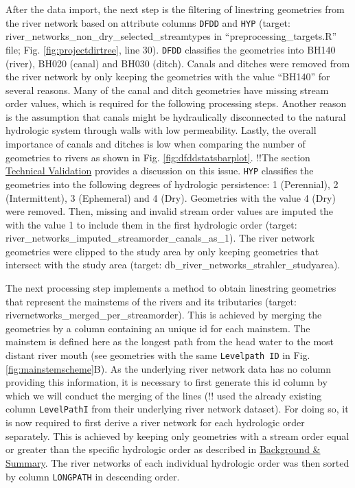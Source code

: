 \documentclass[fleqn,10pt]{wlscirep}
\begin{document}
After the data import, the next step is the filtering of linestring geometries from the river network based on attribute columns \texttt{DFDD} and \texttt{HYP} (target: river\_networks\_non\_dry\_selected\_streamtypes in ``preprocessing\_targets.R'' file; Fig. \ref{fig:projectdirtree}, line 30). \texttt{DFDD} classifies the geometries into BH140 (river), BH020 (canal) and BH030 (ditch). Canals and ditches were removed from the river network by only keeping the geometries with the value ``BH140'' for several reasons. Many of the canal and ditch geometries have missing stream order values, which is required for the following processing steps. Another reason is the assumption that canals might be hydraulically disconnected to the natural hydrologic system through walls with low permeability. Lastly, the overall importance of canals and ditches is low when comparing the number of geometries to rivers as shown in Fig. \ref{fig:dfddstatsbarplot}. !!The section \protect\hyperlink{technical-validation}{Technical Validation} provides a discussion on this issue. \texttt{HYP} classifies the geometries into the following degrees of hydrologic persistence: 1 (Perennial), 2 (Intermittent), 3 (Ephemeral) and 4 (Dry). Geometries with the value 4 (Dry) were removed. Then, missing and invalid stream order values are imputed the with the value 1 to include them in the first hydrologic order (target: river\_networks\_imputed\_streamorder\_canals\_as\_1). The river network geometries were clipped to the study area by only keeping geometries that intersect with the study area (target: db\_river\_networks\_strahler\_studyarea).

The next processing step implements a method to obtain linestring geometries that represent the mainstems of the rivers and its tributaries (target: rivernetworks\_merged\_per\_streamorder). This is achieved by merging the geometries by a column containing an unique id for each mainstem. The mainstem is defined here as the longest path from the head water to the most distant river mouth (see geometries with the same \texttt{Levelpath\ ID} in Fig. \ref{fig:mainstemscheme}B). As the underlying river network data has no column providing this information, it is necessary to first generate this id column by which we will conduct the merging of the lines (!!\cite{belitz_multiorder_2019} used the already existing column \texttt{LevelPathI} from their underlying river network dataset). For doing so, it is now required to first derive a river network for each hydrologic order separately. This is achieved by keeping only geometries with a stream order equal or greater than the specific hydrologic order as described in \protect\hyperlink{background-summary}{Background \& Summary}. The river networks of each individual hydrologic order was then sorted by column \texttt{LONGPATH} in descending order.
\end{document}
